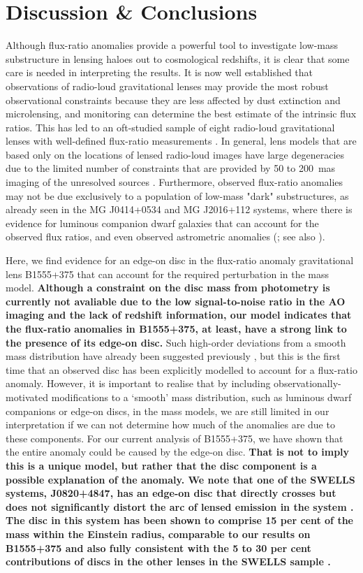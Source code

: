\documentclass[a4paper,fleqn,usenatbib,useAMS]{mnras}
\begin{document}
\section{Discussion \& Conclusions}

Although flux-ratio anomalies provide a powerful tool to investigate low-mass substructure in lensing haloes out to cosmological redshifts, it is clear that some care is needed in interpreting the results. It is now well established that observations of radio-loud gravitational lenses may provide the most robust observational constraints because they are less affected by dust extinction and microlensing, and monitoring can determine the best estimate of the intrinsic flux ratios. This has led to an oft-studied sample of eight radio-loud gravitational lenses with well-defined flux-ratio measurements \citep{Dalal2002,KD04,Xu15}. In general, lens models that are based only on the locations of lensed radio-loud images have large degeneracies due to the limited number of constraints that are provided by 50 to 200~mas imaging of the unresolved sources \citep[e.g.][]{Ka91}. Furthermore, observed flux-ratio anomalies may not be due exclusively to a population of low-mass "dark" substructures, as already seen in the MG J0414+0534 and MG J2016+112 systems, where there is evidence for luminous companion dwarf galaxies that can account for the observed flux ratios, and even observed astrometric anomalies (\citealt{ros00,chen07,more09}; see also \citealt{mckean07,jackson10}). 

Here, we find evidence for an edge-on disc in the flux-ratio anomaly
gravitational lens B1555+375 that can account for the required
perturbation in the mass model.  \textbf{Although a constraint on the disc mass from photometry is currently not avaliable due to the low signal-to-noise ratio in the AO imaging and the lack of redshift information, our model indicates that the flux-ratio anomalies in B1555+375, at least, have a strong link to the presence of its edge-on disc. } Such
high-order deviations from a smooth mass distribution have already
been suggested previously \citep{evans03, congdon05}, but this is the
first time that an observed disc has been explicitly modelled to
account for a flux-ratio anomaly. However, it is important to realise
that by including observationally-motivated modifications to a
`smooth' mass distribution, such as luminous dwarf companions or
edge-on discs, in the mass models, we are still limited in our
interpretation if we can not determine how much of the anomalies are
due to these components. For our current analysis of B1555+375, we
have shown that the entire anomaly could be caused by the edge-on
disc. 
\textbf{That is not to imply this is a unique model, but rather that the
disc component is a possible explanation of the anomaly.  We note that
one of the SWELLS systems, J0820+4847, has an edge-on disc that directly
crosses but does not significantly distort the arc of lensed emission in the system \citep{swells1}. The disc in this system
has been shown to comprise 15 per cent of the mass within the Einstein
radius, comparable to our results on B1555+375 and also fully consistent with
the 5 to 30 per cent contributions of discs in the other lenses in the 
SWELLS sample \citep{swells1,swells3,swells6}.}
\end{document}
